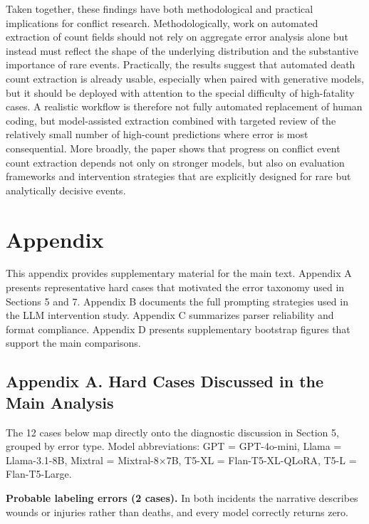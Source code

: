 \documentclass[
  11pt,
]{article}
\begin{document}
Taken together, these findings have both methodological and practical
implications for conflict research. Methodologically, work on automated
extraction of count fields should not rely on aggregate error analysis
alone but instead must reflect the shape of the underlying distribution
and the substantive importance of rare events. Practically, the results
suggest that automated death count extraction is already usable,
especially when paired with generative models, but it should be deployed
with attention to the special difficulty of high-fatality cases. A
realistic workflow is therefore not fully automated replacement of human
coding, but model-assisted extraction combined with targeted review of
the relatively small number of high-count predictions where error is
most consequential. More broadly, the paper shows that progress on
conflict event count extraction depends not only on stronger models, but
also on evaluation frameworks and intervention strategies that are
explicitly designed for rare but analytically decisive events.

\newpage

\section{Appendix}\label{appendix}

This appendix provides supplementary material for the main text.
Appendix A presents representative hard cases that motivated the error
taxonomy used in Sections 5 and 7. Appendix B documents the full
prompting strategies used in the LLM intervention study. Appendix C
summarizes parser reliability and format compliance. Appendix D presents
supplementary bootstrap figures that support the main comparisons.

\subsection{Appendix A. Hard Cases Discussed in the Main
Analysis}\label{appendix-a.-hard-cases-discussed-in-the-main-analysis}

The 12 cases below map directly onto the diagnostic discussion in
Section 5, grouped by error type. Model abbreviations: GPT =
GPT-4o-mini, Llama = Llama-3.1-8B, Mixtral = Mixtral-8×7B, T5-XL =
Flan-T5-XL-QLoRA, T5-L = Flan-T5-Large.

\medskip\noindent \textbf{Probable labeling errors (2 cases).} In both
incidents the narrative describes wounds or injuries rather than deaths,
and every model correctly returns zero.
\end{document}

